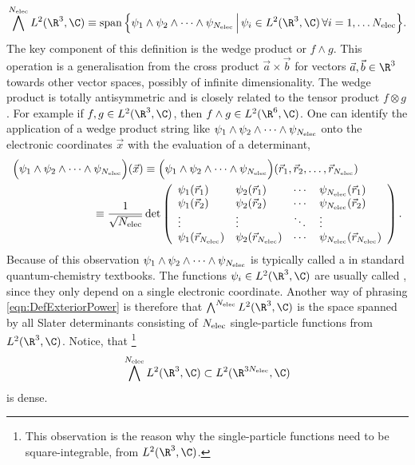 \begin{equation}
	\bigwedge^{\Nelec} L^2(\R^3, \C)
	\equiv \spacespan \Big\{ \wedgestring
	\, \Big| \, \psi_i \in L^2(\R^3, \C) \, \forall i = 1, \ldots \Nelec \Big\}.
	\label{eqn:DefExteriorPower}
\end{equation}
The key component of this definition is the wedge product
or  $f \wedge g$.
This operation is a generalisation from the cross product $\vec{a} \times \vec{b}$
for vectors $\vec{a}, \vec{b} \in \R^3$
towards other vector spaces,
possibly of infinite dimensionality.
The wedge product is totally antisymmetric and is closely related
to the tensor product $f \otimes g$.
For example if $f, g \in L^2(\R^3, \C)$, then $f \wedge g \in L^2(\R^6, \C)$.
One can identify
the application of a wedge product string like $\psi_1 \wedge \psi_2 \wedge \cdots \wedge \psi_{N_\text{elec}}$
onto the electronic coordinates $\vec{x}$
with the evaluation of a determinant, \ie
\begin{align*}
	\Big(\wedgestring\Big) (\vec{x})
	&\equiv \Big(\wedgestring\Big) (\vec{r}_1, \vec{r}_2, \ldots, \vec{r}_{\Nelec}) \\
	\equiv \frac{1}{\sqrt{\Nelec}} &\det
	\left(
	\begin{array}{*{6}{l}}
		\psi_1(\vec{r}_1) & \psi_2(\vec{r}_1) & \cdots & \psi_{\Nelec}(\vec{r}_1) \\
		\psi_1(\vec{r}_2) & \psi_2(\vec{r}_2) & \cdots & \psi_{\Nelec}(\vec{r}_2) \\
		\vdots & \vdots & \ddots & \vdots \\
		\psi_1(\vec{r}_{\Nelec}) & \psi_2(\vec{r}_{\Nelec}) & \cdots & \psi_{\Nelec}(\vec{r}_{\Nelec}) \\
	\end{array}
	\right).
\end{align*}
Because of this observation $\psi_1 \wedge \psi_2 \wedge \cdots \wedge \psi_{N_\text{elec}}$
is typically called a 
in standard quantum-chemistry textbooks.
The functions $\psi_i \in L^2(\R^3, \C)$
are usually called ,
since they only depend on a single electronic coordinate.
Another way of phrasing \eqref{eqn:DefExteriorPower}
is therefore that $\bigwedge^{\Nelec} L^2(\R^3, \C)$
is the space spanned by all Slater determinants
consisting of $N_\text{elec}$ single-particle functions from $L^2(\R^3, \C)$.
Notice, that%
\footnote{%
	This observation is the reason why the single-particle functions
	need to be square-integrable, \ie from $L^2(\R^3, \C)$.
}
\[ \bigwedge^{\Nelec} L^2(\R^3, \C) \subset L^2(\R^{3\Nelec}, \C) \]
is dense.


